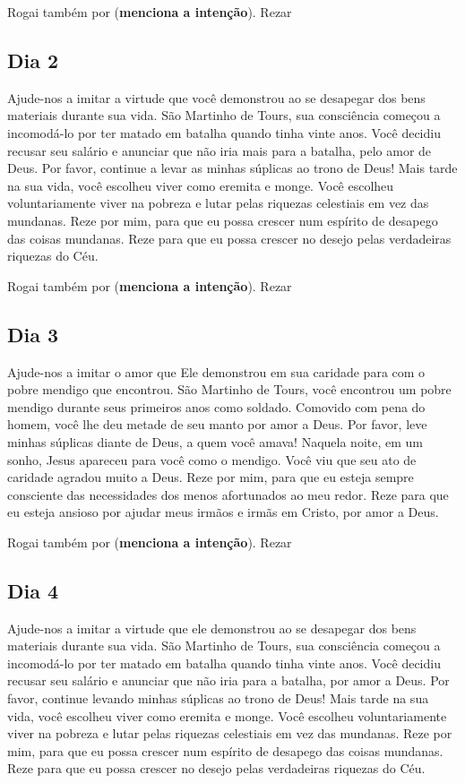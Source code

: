 \documentclass[a4paper,14pt,twoside]{extarticle} \usepackage[utf8]{inputenc}
\begin{document}
Rogai também por (\textbf{menciona a intenção}). Rezar \textbf{}

\subsection{Dia 2}
Ajude-nos a imitar a virtude que você demonstrou ao se desapegar dos bens materiais durante sua vida. São Martinho de Tours, sua consciência começou a incomodá-lo por ter matado em batalha quando tinha vinte anos. Você decidiu recusar seu salário e anunciar que não iria mais para a batalha, pelo amor de Deus. Por favor, continue a levar as minhas súplicas ao trono de Deus! Mais tarde na sua vida, você escolheu viver como eremita e monge. Você escolheu voluntariamente viver na pobreza e lutar pelas riquezas celestiais em vez das mundanas. Reze por mim, para que eu possa crescer num espírito de desapego das coisas mundanas. Reze para que eu possa crescer no desejo pelas verdadeiras riquezas do Céu. 

Rogai também por (\textbf{menciona a intenção}). Rezar \textbf{}

\subsection{Dia 3}
Ajude-nos a imitar o amor que Ele demonstrou em sua caridade para com o pobre mendigo que encontrou. São Martinho de Tours, você encontrou um pobre mendigo durante seus primeiros anos como soldado. Comovido com pena do homem, você lhe deu metade de seu manto por amor a Deus. Por favor, leve minhas súplicas diante de Deus, a quem você amava! Naquela noite, em um sonho, Jesus apareceu para você como o mendigo. Você viu que seu ato de caridade agradou muito a Deus. Reze por mim, para que eu esteja sempre consciente das necessidades dos menos afortunados ao meu redor. Reze para que eu esteja ansioso por ajudar meus irmãos e irmãs em Cristo, por amor a Deus. 

Rogai também por (\textbf{menciona a intenção}). Rezar \textbf{}

\subsection{Dia 4}
Ajude-nos a imitar a virtude que ele demonstrou ao se desapegar dos bens materiais durante sua vida. São Martinho de Tours, sua consciência começou a incomodá-lo por ter matado em batalha quando tinha vinte anos. Você decidiu recusar seu salário e anunciar que não iria para a batalha, por amor a Deus. Por favor, continue levando minhas súplicas ao trono de Deus! Mais tarde na sua vida, você escolheu viver como eremita e monge. Você escolheu voluntariamente viver na pobreza e lutar pelas riquezas celestiais em vez das mundanas. Reze por mim, para que eu possa crescer num espírito de desapego das coisas mundanas. Reze para que eu possa crescer no desejo pelas verdadeiras riquezas do Céu. 
\end{document}
